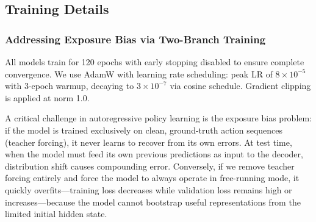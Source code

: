 \documentclass{article}
\begin{document}
\subsection{Training Details}
\subsubsection{Addressing Exposure Bias via Two-Branch Training}
All models train for 120 epochs with early stopping disabled to ensure complete convergence. We use AdamW with learning rate scheduling: peak LR of $8 \times 10^{-5}$ with 3-epoch warmup, decaying to $3 \times 10^{-7}$ via cosine schedule. Gradient clipping is applied at norm 1.0.

A critical challenge in autoregressive policy learning is the exposure bias problem: if the model is trained exclusively on clean, ground-truth action sequences (teacher forcing), it never learns to recover from its own errors. At test time, when the model must feed its own previous predictions as input to the decoder, distribution shift causes compounding error. Conversely, if we remove teacher forcing entirely and force the model to always operate in free-running mode, it quickly overfits---training loss decreases while validation loss remains high or increases---because the model cannot bootstrap useful representations from the limited initial hidden state.
\end{document}
